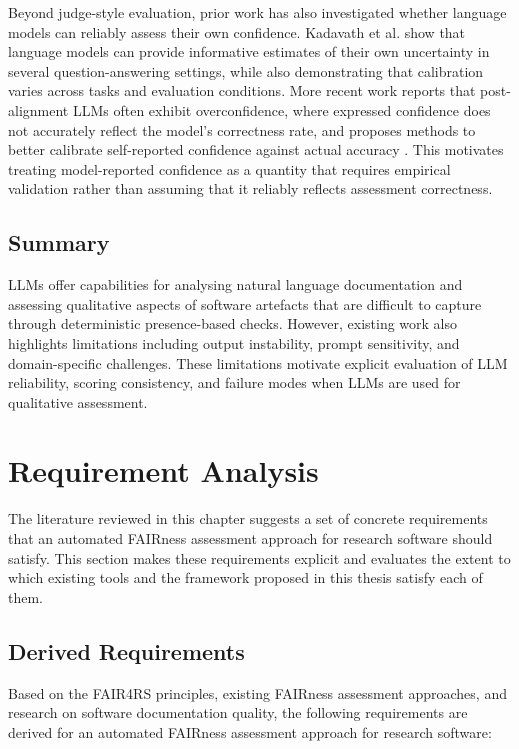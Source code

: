 Beyond judge-style evaluation, prior work has also investigated
whether language models can reliably assess their own confidence.
Kadavath et al. \cite{kadavath2022know} show that language models can
provide informative estimates of their own uncertainty in several
question-answering settings, while also demonstrating that calibration
varies across tasks and evaluation conditions. More recent work
reports that post-alignment LLMs often exhibit overconfidence, where
expressed confidence does not accurately reflect the model's
correctness rate, and proposes methods to better calibrate
self-reported confidence against actual accuracy
\cite{zhang2024calibrating}. This motivates treating model-reported
confidence as a quantity that requires empirical validation rather
than assuming that it reliably reflects assessment correctness.

\subsection{Summary}

LLMs offer capabilities for analysing natural language documentation
and assessing qualitative aspects of software artefacts that are
difficult to capture through deterministic presence-based checks.
However, existing work also highlights limitations including output
instability, prompt sensitivity, and domain-specific challenges.
These limitations motivate explicit evaluation of LLM reliability,
scoring consistency, and failure modes when LLMs are used for
qualitative assessment.

\section{Requirement Analysis}

The literature reviewed in this chapter suggests a set of concrete
requirements that an automated FAIRness assessment approach for
research software should satisfy. This section makes these
requirements explicit and evaluates the extent to which existing
tools and the framework proposed in this thesis satisfy each of them.

\subsection{Derived Requirements}

Based on the FAIR4RS principles, existing FAIRness assessment
approaches, and research on software documentation quality, the
following requirements are derived for an automated FAIRness
assessment approach for research software:

